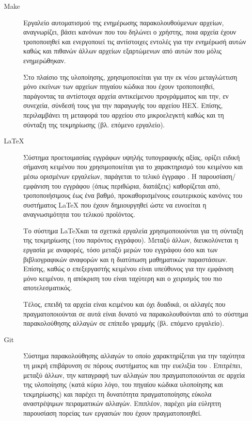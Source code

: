 \begin{description}

\item[Make]
Εργαλείο αυτοματισμού της ενημέρωσης παρακολουθούμενων αρχείων, αναγνωρίζει,
βάσει κανόνων που του δηλώνει ο χρήστης, ποια αρχεία έχουν τροποποιηθεί και
ενεργοποιεί τις αντίστοιχες εντολές για την ενημέρωσή αυτών καθώς και πιθανών
άλλων αρχείων εξαρτώμενων από αυτών που μόλις ενημερώθηκαν.

Στο πλαίσιο της
υλοποίησης, χρησιμοποιείται για την εκ νέου μεταγλώττιση μόνο εκείνων των
αρχείων πηγαίου κώδικα που έχουν τροποποιηθεί, παράγοντας τα αντίστοιχα αρχεία
αντικείμενου προγράμματος και την, εν συνεχεία, σύνδεσή τους για την παραγωγής
του αρχείου HEX. Επίσης, περιλαμβάνει τη μεταφορά του αρχείου στο μικροελεγκτή
καθώς και τη σύνταξη της τεκμηρίωσης (βλ. επόμενο εργαλείο).


\item[\LaTeX]
Σύστημα προετοιμασίας εγγράφων υψηλής τυπογραφικής αξίας, ορίζει ειδική σήμανση
κειμένου που χρησιμοποιείται για το χαρακτηρισμό του κειμένου και μέσω ορισμένων
εργαλείων, παράγεται το τελικό έγγραφο \parencite{latex}. Η παρουσίαση\slash{}%
εμφάνιση του εγγράφου (όπως περιθώρια, διατάξεις) καθορίζεται από,
τροποποιήσιμους έως ένα βαθμό, προκαθορισμένους εσωτερικούς κανόνες του
συστήματος \LaTeX{}  που έχουν δημιουργηθεί ώστε να ευνοείται η αναγνωσιμότητα
του τελικού προϊόντος.

Το σύστημα \LaTeX και τα σχετικά εργαλεία χρησιμοποιούνται για τη σύνταξη της
τεκμηρίωσης (του παρόντος εγγράφου). Μεταξύ άλλων, διευκολύνεται η εργασία με
αναφορές, τόσο μεταξύ μερών του εγγράφου όσο και των βιβλιογραφικών αναφορών και
η διατύπωση μαθηματικών παραστάσεων. Επίσης, καθώς ο επεξεργαστής κειμένου είναι
υπεύθυνος για την εμφάνιση μόνο κειμένου, η απόκριση του είναι ταχύτερη και ο
χειρισμός του πιο αποτελεσματικός.

Τέλος, επειδή τα αρχεία είναι κειμένου και όχι δυαδικά, οι αλλαγές που
πραγματοποιούνται σε αυτά είναι δυνατό να παρακολουθούνται από το σύστημα
παρακολούθησης αλλαγών σε επίπεδο γραμμής (βλ. επόμενο εργαλείο).

\item[Git]
Σύστημα παρακολούθησης αλλαγών το οποίο χαρακτηρίζεται για την ταχύτητα
τη μικρή επιβάρυνση σε πόρους συστήματος και την ευελιξία του \parencite{git}.
Επιτρέπει, μεταξύ άλλων, την καταγραφή των αλλαγών που πραγματοποιούνται σε
αρχεία της υλοποίησης (κατά κύριο λόγο, του πηγαίου κώδικα υλοποίησης και
τεκμηρίωσης) και παρέχει τη δυνατότητα πραγματοποίησης εύκολα αναστρέψιμων
πειραματικών αλλαγών.
Επιπλέον, παρέχει μία εύληπτη παρουσίαση πορείας των εργασιών που έχουν
πραγματοποιηθεί.


\end{description}
